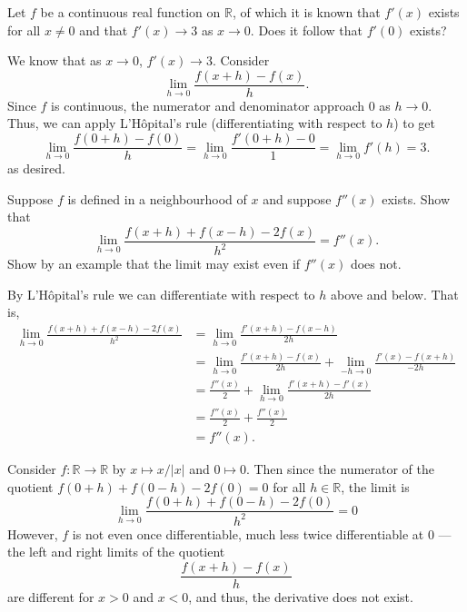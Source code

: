 \documentclass[12 pt, letterpaper]{hmcpset}
\begin{document}
\begin{problem}
	Let $f$ be a continuous real function on $\mathbb{R}$, of which it is known that $f'(x)$ exists for all $x \neq 0$ and that $f'(x) \to 3$ as $x \to 0$. Does it follow that $f'(0)$ exists?
\end{problem}

\begin{solution}
	We know that as $x \to 0$, $f'(x) \to 3$. Consider
	\[
		\lim_{h \to 0} \frac{f(x + h) - f(x)}{h}.
	\]
	Since $f$ is continuous, the numerator and denominator approach $0$ as $h \to 0$. Thus, we can apply L'H\^opital's rule (differentiating with respect to $h$) to get
	\begin{equation*}
		\lim_{h \to 0} \frac{f(0 + h) - f(0)}{h} = \lim_{h \to 0} \frac{f'(0 + h) - 0}{1} = \lim_{h \to 0} f'(h) = 3.
	\end{equation*}
	as desired.
\end{solution}

\pagebreak

\begin{problem}
	Suppose $f$ is defined in a neighbourhood of $x$ and suppose $f''(x)$ exists. Show that
	\[
		\lim_{h \to 0} \frac{f(x + h) + f(x - h) - 2 f(x)}{h^{2}} = f''(x).
	\]
	Show by an example that the limit may exist even if $f''(x)$ does not.
\end{problem}

\begin{solution}
	By L'H\^opital's rule we can differentiate with respect to $h$ above and below. That is,
	\begin{align*}
		\lim_{h \to 0} \frac{f(x + h) + f(x - h) - 2 f(x)}{h^{2}} & = \lim_{h \to 0} \frac{f'(x + h) - f(x - h)}{2 h} \\
		& = \lim_{h \to 0} \frac{f'(x + h) - f(x)}{2h} + \lim_{-h \to 0} \frac{f'(x) - f(x + h)}{-2h} \\
		& = \frac{f''(x)}{2} + \lim_{h \to 0} \frac{f'(x + h) - f'(x)}{2h} \\
		& = \frac{f''(x)}{2} + \frac{f''(x)}{2} \\
		& = f''(x).
	\end{align*}
	
	Consider $f : \mathbb{R} \to \mathbb{R}$ by $x \mapsto x / \lvert x \rvert$ and $0 \mapsto 0$. Then since the numerator of the quotient $f(0 + h) + f(0 - h) - 2 f(0) = 0$ for all $h \in \mathbb{R}$, the limit is
	\[
		\lim_{h \to 0} \frac{f(0 + h) + f(0 - h) - 2 f(0)}{h^{2}} = 0
	\]
	However, $f$ is not even once differentiable, much less twice differentiable at $0$ --- the left and right limits of the quotient
	\[
		\frac{f(x + h) - f(x)}{h}
	\]
	are different for $x > 0$ and $x < 0$, and thus, the derivative does not exist.
\end{solution}
\end{document}
